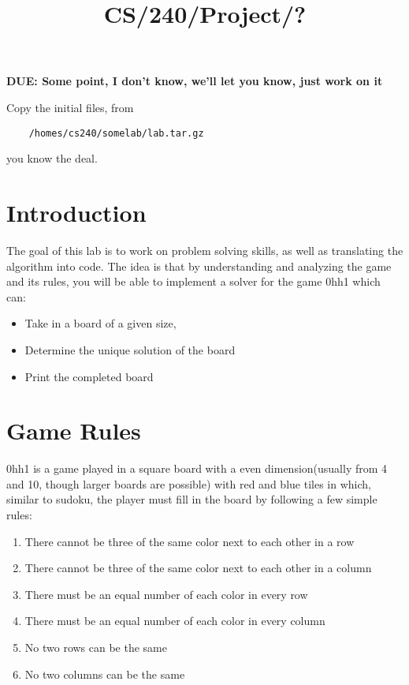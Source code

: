 \documentclass{article}
\author{}\date{}\title{CS/240/Project/?}
\begin{document}
\maketitle
\newcommand{\C}[1]{\lstinline[language=C,basicstyle=\ttfamily]!#1!}
\lstset{
  tabsize=2,  columns=fullflexible,  basicstyle=\ttfamily,
  keywordstyle=\bfseries,  commentstyle=\rmfamily\itshape,
  mathescape=true,  showstringspaces=false,  showspaces=false}

\vspace*{-10mm}
\noindent

\textbf{DUE: Some point, I don't know, we'll let you know, just work on it}

\medskip
\noindent
Copy the initial files, from
\begin{lstlisting}
	/homes/cs240/somelab/lab.tar.gz
\end{lstlisting}
you know the deal.

\section{Introduction}
The goal of this lab is to work on problem solving skills, as well as translating the algorithm into code.
The idea is that by understanding and analyzing the game and its rules, you will be able to implement 
a solver for the game 0hh1 which can:
\begin{itemize}
\item Take in a board of a given size,
\item Determine the unique solution of the board
\item Print the completed board
\end{itemize}

\section{Game Rules}
0hh1 is a game played in a square board with a even dimension(usually from 4 and 10, 
though larger boards are possible) with red and blue tiles in which, 
similar to sudoku, the player must fill in the board by following a few simple rules:
\begin{enumerate}
\item There cannot be three of the same color next to each other in a row
\item There cannot be three of the same color next to each other in a column
\item There must be an equal number of each color in every row
\item There must be an equal number of each color in every column
\item No two rows can be the same
\item No two columns can be the same
\end{enumerate}
\end{document}
